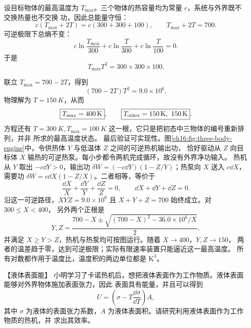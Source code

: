 {\begin{xesolution}
设目标物体的最高温度为 $T_{\max}$。三个物体的热容量均为常量 $c$，系统与外界既不交换热量也不交换
功，因此总能量守恒：
\[
  c(T_{\max}+2T)=c(300+300+100),
  \qquad T_{\max}+2T=700.
\]
可逆极限下总熵不变：
\[
  c\ln\frac{T_{\max}}{300}
  +c\ln\frac{T}{300}
  +c\ln\frac{T}{100}=0.
\]
于是
\[
  T_{\max}T^2=300\times300\times100.
\]

\par\noindent\begin{minipage}{\linewidth}
\threeBodiesDiagram
{}\label{ch16:fig:three-body-engine}
\end{minipage}\par\medskip

联立 $T_{\max}=700-2T$，得到
\[
  (700-2T)T^2=9.0\times10^6.
\]
物理解为 $T=\SI{150}{K}$，从而
\[
  \boxed{T_{\max}=\SI{400}{K}},
  \qquad
  \boxed{T_{\rm other}=\SI{150}{K},\ \SI{150}{K}}.
\]
方程还有 $T=\SI{300}{K},T_{\max}=\SI{100}{K}$ 这一根，它只是把初态中三物体的编号重新排列，并非
所求的最高温度状态。
最后验证可实现性。图\ref{ch16:fig:three-body-engine}中，令供热体 $Y$ 与低温体 $Z$ 之间的可逆热机输出功，
恰好驱动从 $Z$ 向目标体 $X$ 输热的可逆热泵。每小步都令两机完成循环，故没有外界净功输入。
热机从 $Y$ 取出 $-c\dd Y>0$，输出功
$\delta W=(-c\dd Y)(1-Z/Y)$；热泵向 $X$ 送入 $c\dd X$，需要功
$\delta W=c\dd X(1-Z/X)$。二者相等，等价于
\[
 \frac{\dd X}{X}+\frac{\dd Y}{Y}+\frac{\dd Z}{Z}=0,
 \qquad \dd X+\dd Y+\dd Z=0.
\]
沿这一可逆路径，$XYZ=9.0\times10^6$ 且 $X+Y+Z=700$ 始终成立。对 $300\le X<400$，
另外两个正根是
\[
 Y,Z=\frac{700-X\pm\sqrt{(700-X)^2-36.0\times10^6/X}}{2},
\]
并满足 $X\ge Y>Z$，热机与热泵均可按图运行。随着 $X\to400$，$Y,Z\to150$，
两者的温差趋于零，达到可逆极限；实际有限速率装置只能逼近这一最高温度。
所有对数都作用于温度比，温度积的两边单位都是 $\mathrm K^3$。
\end{xesolution}


\begin{origexamplebox}{【液体表面能】}\label{ch16:ex:s30-21-5}
小明学习了卡诺热机后，想把液体表面作为工作物质。液体表面能够对外界物体施加表面张力，因此
表面具有能量，并且可以得到
\[
  U=\left(\sigma-T\frac{\dd\sigma}{\dd T}\right)A,
\]
其中 $\sigma$ 为液体的表面张力系数，$A$ 为液体表面积。请研究利用液体表面作为工作物质的热机，并
求出其效率。

\ThQSurfaceEngine
\end{origexamplebox}\par\nopagebreak[4]

}
